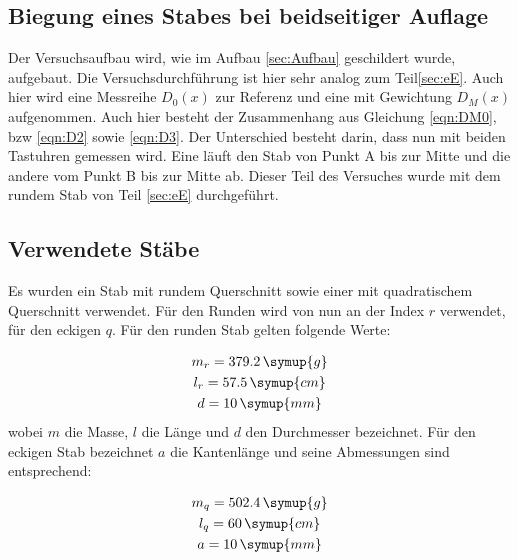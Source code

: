 \subsection{Biegung eines Stabes bei beidseitiger Auflage}
\label{sec:bA}
Der Versuchsaufbau wird, wie im Aufbau \ref{sec:Aufbau} geschildert wurde,
aufgebaut. Die Versuchsdurchführung ist hier sehr analog zum Teil\ref{sec:eE}.
Auch hier wird eine Messreihe $D_0 (x)$ zur Referenz und eine mit
Gewichtung $D_M (x)$ aufgenommen.
Auch hier besteht der Zusammenhang aus Gleichung \eqref{eqn:DM0}, bzw \eqref{eqn:D2} sowie \eqref{eqn:D3}.
Der Unterschied besteht darin,
dass nun mit beiden Tastuhren gemessen wird. Eine läuft den Stab von Punkt A bis
zur Mitte und die andere vom Punkt B bis zur Mitte ab. Dieser Teil des Versuches
wurde mit dem rundem Stab von Teil \ref{sec:eE} durchgeführt.

\subsection{Verwendete Stäbe}
\label{sec:Stäbe}

Es wurden ein Stab mit rundem Querschnitt sowie einer mit quadratischem Querschnitt verwendet.  Für den Runden wird von nun an der Index $r$ verwendet, für den eckigen $q$. Für den runden Stab gelten folgende Werte:

\begin{gather*}
  m_r = 379.2 \, \symup{g} \\
  l_r = 57.5 \, \symup{cm} \\
  d= 10 \, \symup{mm}
\end{gather*}
wobei $m$ die Masse, $l$ die Länge und $d$ den Durchmesser bezeichnet.
Für den eckigen Stab bezeichnet $a$ die Kantenlänge und seine Abmessungen sind entsprechend:

\begin{gather*}
  m_q = 502.4 \, \symup{g} \\
  l_q = 60 \, \symup{cm}   \\
  a = 10 \, \symup{mm}
\end{gather*}
